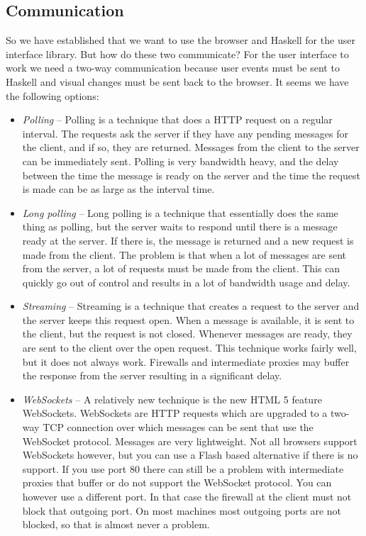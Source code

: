 \documentclass[11pt]{article}
\begin{document}
\subsection{Communication}

So we have established that we want to use the browser and Haskell for the user interface library.
But how do these two communicate?
For the user interface to work we need a two-way communication because user events must be sent to Haskell and visual changes must be sent back to the browser.
It seems we have the following options:

\begin{itemize}
\item \textit{Polling} -- Polling is a technique that does a HTTP request on a regular interval.
The requests ask the server if they have any pending messages for the client, and if so, they are returned. Messages from the client to the server can be immediately sent.
Polling is very bandwidth heavy, and the delay between the time the message is ready on the server and the time the request is made can be as large as the interval time.
\item \textit{Long polling} -- Long polling is a technique that essentially does the same thing as polling, but the server waits to respond until there is a message ready at the server.
If there is, the message is returned and a new request is made from the client.
The problem is that when a lot of messages are sent from the server, a lot of requests must be made from the client.
This can quickly go out of control and results in a lot of bandwidth usage and delay.
\item \textit{Streaming} -- Streaming is a technique that creates a request to the server and the server keeps this request open.
When a message is available, it is sent to the client, but the request is not closed.
Whenever messages are ready, they are sent to the client over the open request.
This technique works fairly well, but it does not always work.
Firewalls and intermediate proxies may buffer the response from the server resulting in a significant delay.
\item \textit{WebSockets} -- A relatively new technique is the new HTML 5 feature WebSockets.
WebSockets are HTTP requests which are upgraded to a two-way TCP connection over which messages can be sent that use the WebSocket protocol.
Messages are very lightweight.
Not all browsers support WebSockets however, but you can use a Flash based alternative if there is no support.
If you use port 80 there can still be a problem with intermediate proxies that buffer or do not support the WebSocket protocol.
You can however use a different port.
In that case the firewall at the client must not block that outgoing port.
On most machines most outgoing ports are not blocked, so that is almost never a problem.
\end{itemize}
\end{document}
